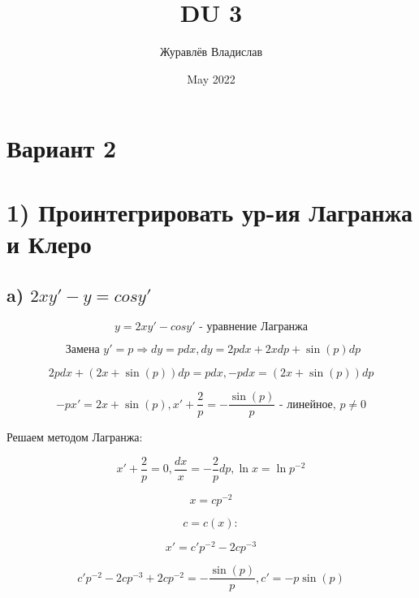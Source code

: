 \documentclass{article}
\title{ DU 3}
\author{Журавлёв Владислав}
\date{May 2022}
\begin{document}
\maketitle

\section*{Вариант 2}
\section*{1) Проинтегрировать ур-ия Лагранжа и Клеро}
\subsection*{a) $ 2xy' - y = cosy'$}

\begin{equation*}
    y = 2xy' - cosy' \text{ - уравнение Лагранжа}
\end{equation*}

\begin{equation*}
    \text{ Замена } y' = p \Rightarrow dy = pdx, dy = 2pdx + 2xdp + \sin{(p)}dp
\end{equation*}

\begin{equation*}
    2pdx + (2x + \sin{(p)})dp = pdx, -pdx = (2x + \sin{(p)})dp
\end{equation*}

\begin{equation*}
    -px' = 2x + \sin{(p)} , x' + \frac{2}{p} = -\frac{\sin{(p)}}{p} \text{ - линейное, } p \ne 0
\end{equation*}

Решаем методом Лагранжа:

\begin{equation*}
    x' + \frac{2}{p} = 0, \frac{dx}{x} = -\frac{2}{p}dp, \ln{x} = \ln{p^{-2}}
\end{equation*}

\begin{equation*}
    x = cp^{-2}
\end{equation*}

\begin{equation*}
    c = c(x):    
\end{equation*}

\begin{equation*}
  x' = c'p^{-2} - 2cp^{-3}
\end{equation*}

\begin{equation*}
    c'p^{-2} - 2cp^{-3} + 2cp^{-2} = -\frac{\sin{(p)}}{p}, c' = -p\sin{(p)}
\end{equation*}
\end{document}
